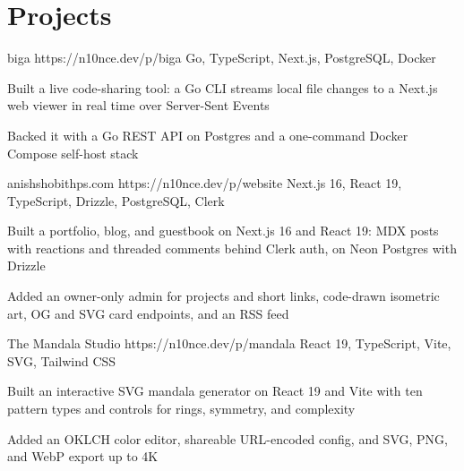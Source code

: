 \section*{Projects}

\project
  {biga}
  {https://n10nce.dev/p/biga}
  {Go, TypeScript, Next.js, PostgreSQL, Docker}
  {
    \item Built a live code-sharing tool: a Go CLI streams local file changes to a Next.js web viewer in real time over Server-Sent Events
    \item Backed it with a Go REST API on Postgres and a one-command Docker Compose self-host stack
  }

\project
  {anishshobithps.com}
  {https://n10nce.dev/p/website}
  {Next.js 16, React 19, TypeScript, Drizzle, PostgreSQL, Clerk}
  {
    \item Built a portfolio, blog, and guestbook on Next.js 16 and React 19: MDX posts with reactions and threaded comments behind Clerk auth, on Neon Postgres with Drizzle
    \item Added an owner-only admin for projects and short links, code-drawn isometric art, OG and SVG card endpoints, and an RSS feed
  }

\project
  {The Mandala Studio}
  {https://n10nce.dev/p/mandala}
  {React 19, TypeScript, Vite, SVG, Tailwind CSS}
  {
    \item Built an interactive SVG mandala generator on React 19 and Vite with ten pattern types and controls for rings, symmetry, and complexity
    \item Added an OKLCH color editor, shareable URL-encoded config, and SVG, PNG, and WebP export up to 4K
  }
